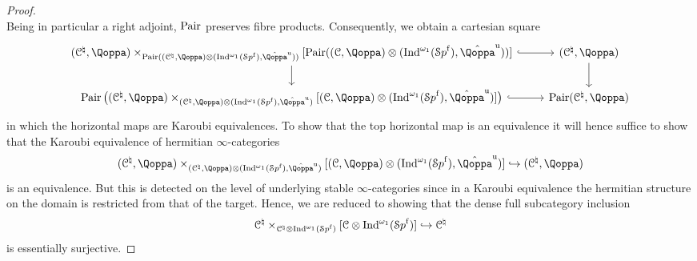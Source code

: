 \begin{proof}
\[\]
Being in particular a right adjoint, $\operatorname{Pair}$ preserves fibre products. Consequently, we obtain a cartesian square
\[
\begin{tikzcd}
(\C^{\natural},\QF)\times_{\Pairings((\C^{\natural},\QF) \otimes (\Ind^{\omega_1}(\Spaf),\hat{\QF}^{\uni}))} [\Pairings((\C,\QF) \otimes (\Ind^{\omega_1}(\Spaf),\hat{\QF}^{\uni}))] \ar[d]\ar[r,hookrightarrow] & (\C^{\natural},\QF) \ar[d] \\
\Pairings\big((\C^{\natural},\QF) \times_{(\C^{\natural},\QF) \otimes (\Ind^{\omega_1}(\Spaf),\hat{\QF}^\uni)} [(\C,\QF) \otimes (\Ind^{\omega_1}(\Spaf),\hat{\QF}^\uni)] \big) \ar[r,hookrightarrow] & \Pairings(\C^{\natural},\QF) 
\end{tikzcd}
\]
in which the horizontal maps are Karoubi equivalences. To show that the top horizontal map is an equivalence it will hence suffice to show that the Karoubi equivalence of hermitian $\infty$-categories 
\[
(\C^{\natural},\QF) \times_{(\C^{\natural},\QF) \otimes (\Ind^{\omega_1}(\Spaf),\hat{\QF}^\uni)} [(\C,\QF) \otimes (\Ind^{\omega_1}(\Spaf),\hat{\QF}^\uni)] \hookrightarrow (\C^{\natural},\QF)
\]
is an equivalence. But this is detected on the level of underlying stable $\infty$-categories since in a Karoubi equivalence the hermitian structure on the domain is restricted from that of the target.  Hence, we are reduced to showing that the dense full subcategory inclusion
\[
\mathcal C^{\natural}  \times_{\mathcal C^{\natural} \otimes \operatorname{Ind}^{\omega_1}({\mathcal Sp}^{\mathrm{f}})} [\mathcal C \otimes \operatorname{Ind}^{\omega_1}({\mathcal Sp}^{\mathrm{f}})] \hookrightarrow \mathcal C^{\natural}
\]
is essentially surjective.


\end{proof}
